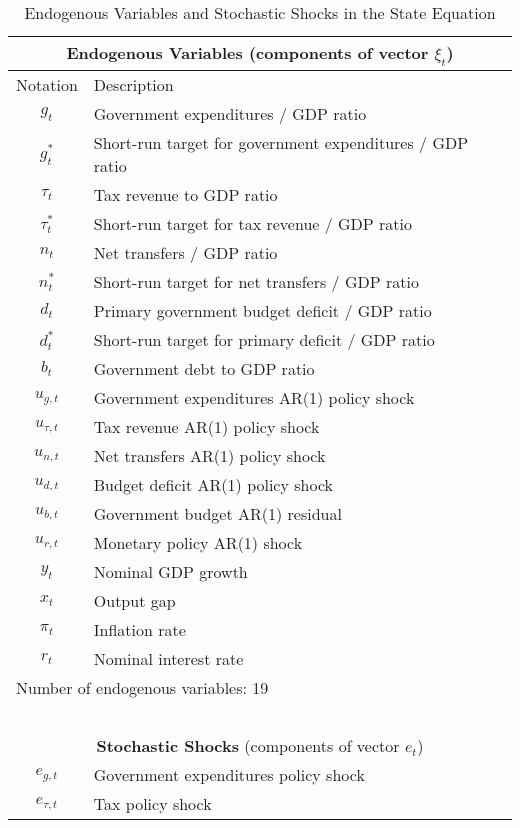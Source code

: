 \documentclass[11pt]{article}
\begin{document}
\begin{table}\caption{Endogenous Variables and Stochastic Shocks in the State Equation}\label{tb:vars}
  \begin{center}\begin{tabular}{cl}
    \multicolumn{2}{c}{\textbf{Endogenous Variables} (components of vector $\xi_t$)} \\ \hline
    Notation & Description \\ \hline
    $g_t$ & Government expenditures / GDP ratio \\
    $g_t^*$ & Short-run target for government expenditures / GDP ratio \\
    $\tau_t$ & Tax revenue to GDP ratio \\
    $\tau_t^*$ & Short-run target for tax revenue / GDP ratio \\
    $n_t$ & Net transfers / GDP ratio \\
    $n_t^*$ & Short-run target for net transfers / GDP ratio \\
    $d_t$ & Primary government budget deficit / GDP ratio \\
    $d_t^*$ & Short-run target for primary deficit / GDP ratio \\
    $b_t$ & Government debt to GDP ratio \\
    $u_{g,t}$ & Government expenditures AR(1) policy shock \\
    $u_{\tau,t}$ & Tax revenue AR(1) policy shock \\
    $u_{n,t}$ & Net transfers AR(1) policy shock \\
    $u_{d,t}$ & Budget deficit AR(1) policy shock \\
    $u_{b,t}$ & Government budget AR(1) residual \\
    $u_{r,t}$ & Monetary policy AR(1) shock \\ 
    $y_t$ & Nominal GDP growth \\
    $x_t$ & Output gap \\
    $\pi_t$ & Inflation rate \\
    $r_t$ & Nominal interest rate \\ \hline
    \multicolumn{2}{l}{Number of endogenous variables: 19} \\
    \ \\
    \multicolumn{2}{c}{\textbf{Stochastic Shocks} (components of vector $e_t$)} \\ \hline
    $e_{g,t}$ & Government expenditures policy shock \\
    $e_{\tau,t}$ & Tax policy shock \\

\end{tabular}
\end{center}
\end{table}
\end{document}
